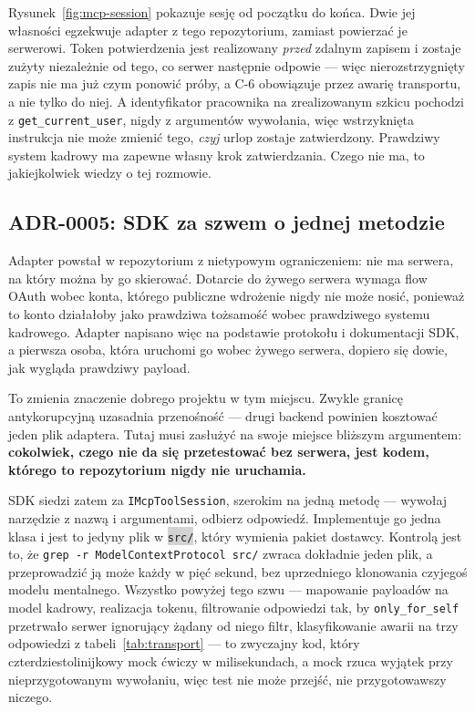 \documentclass[11pt,a4paper]{article}
\newcommand{\repopath}[1]{\colorbox{lightgray}{\texttt{#1}}}
\newcommand{\finding}[1]{{\color{primaryblue}\textbf{#1}}}
\begin{document}
Rysunek~\ref{fig:mcp-session} pokazuje sesję od początku do końca. Dwie jej własności egzekwuje adapter z tego repozytorium, zamiast powierzać je serwerowi. Token potwierdzenia jest realizowany \emph{przed} zdalnym zapisem i zostaje zużyty niezależnie od tego, co serwer następnie odpowie --- więc nierozstrzygnięty zapis nie ma już czym ponowić próby, a C-6 obowiązuje przez awarię transportu, a nie tylko do niej. A identyfikator pracownika na zrealizowanym szkicu pochodzi z \texttt{get\_current\_user}, nigdy z argumentów wywołania, więc wstrzyknięta instrukcja nie może zmienić tego, \emph{czyj} urlop zostaje zatwierdzony. Prawdziwy system kadrowy ma zapewne własny krok zatwierdzania. Czego nie ma, to jakiejkolwiek wiedzy o tej rozmowie.

\subsection{ADR-0005: SDK za szwem o jednej metodzie}

Adapter powstał w repozytorium z nietypowym ograniczeniem: nie ma serwera, na który można by go skierować. Dotarcie do żywego serwera wymaga flow OAuth wobec konta, którego publiczne wdrożenie nigdy nie może nosić, ponieważ to konto działałoby jako prawdziwa tożsamość wobec prawdziwego systemu kadrowego. Adapter napisano więc na podstawie protokołu i dokumentacji SDK, a pierwsza osoba, która uruchomi go wobec żywego serwera, dopiero się dowie, jak wygląda prawdziwy payload.

To zmienia znaczenie dobrego projektu w tym miejscu. Zwykle granicę antykorupcyjną uzasadnia przenośność --- drugi backend powinien kosztować jeden plik adaptera. Tutaj musi zasłużyć na swoje miejsce bliższym argumentem: \finding{cokolwiek, czego nie da się przetestować bez serwera, jest kodem, którego to repozytorium nigdy nie uruchamia.}

SDK siedzi zatem za \texttt{IMcpToolSession}, szerokim na jedną metodę --- wywołaj narzędzie z nazwą i argumentami, odbierz odpowiedź. Implementuje go jedna klasa i jest to jedyny plik w \repopath{src/}, który wymienia pakiet dostawcy. Kontrolą jest to, że \texttt{grep -r ModelContextProtocol src/} zwraca dokładnie jeden plik, a przeprowadzić ją może każdy w pięć sekund, bez uprzedniego klonowania czyjegoś modelu mentalnego. Wszystko powyżej tego szwu --- mapowanie payloadów na model kadrowy, realizacja tokenu, filtrowanie odpowiedzi tak, by \texttt{only\_for\_self} przetrwało serwer ignorujący żądany od niego filtr, klasyfikowanie awarii na trzy odpowiedzi z tabeli~\ref{tab:transport} --- to zwyczajny kod, który czterdziestolinijkowy mock ćwiczy w milisekundach, a mock rzuca wyjątek przy nieprzygotowanym wywołaniu, więc test nie może przejść, nie przygotowawszy niczego.
\end{document}
